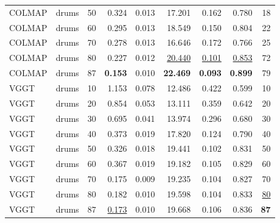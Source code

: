 \begin{table}[H]
\begin{tabular}{llrrrrrrr}
COLMAP & drums & 50 & 0.324 & 0.013 & 17.201 & 0.162 & 0.780 & 18 \\
COLMAP & drums & 60 & 0.295 & 0.013 & 18.549 & 0.150 & 0.804 & 22 \\
COLMAP & drums & 70 & 0.278 & 0.013 & 16.646 & 0.172 & 0.766 & 25 \\
COLMAP & drums & 80 & 0.227 & 0.012 & \underline{20.440} & \underline{0.101} & \underline{0.853} & 72 \\
COLMAP & drums & 87 & \textbf{0.153} & 0.010 & \textbf{22.469} & \textbf{0.093} & \textbf{0.899} & 79 \\
VGGT & drums & 10 & 1.153 & 0.078 & 12.486 & 0.422 & 0.599 & 10 \\
VGGT & drums & 20 & 0.854 & 0.053 & 13.111 & 0.359 & 0.642 & 20 \\
VGGT & drums & 30 & 0.695 & 0.041 & 13.974 & 0.296 & 0.680 & 30 \\
VGGT & drums & 40 & 0.373 & 0.019 & 17.820 & 0.124 & 0.790 & 40 \\
VGGT & drums & 50 & 0.326 & 0.018 & 19.441 & 0.102 & 0.831 & 50 \\
VGGT & drums & 60 & 0.367 & 0.019 & 19.182 & 0.105 & 0.829 & 60 \\
VGGT & drums & 70 & 0.175 & 0.009 & 19.235 & 0.104 & 0.827 & 70 \\
VGGT & drums & 80 & 0.182 & 0.010 & 19.598 & 0.104 & 0.833 & \underline{80} \\
VGGT & drums & 87 & \underline{0.173} & 0.010 & 19.668 & 0.106 & 0.836 & \textbf{87} \\
\bottomrule
\end{tabular}
\end{table}